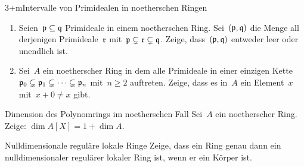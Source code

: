 \documentclass[entwurf]{uebblatt}
\begin{document}

\begin{aufgabe}{3+m}{Intervalle von Primidealen in noetherschen Ringen}
\begin{enumerate}
\item
Seien~$\mathfrak{p} \subseteq \mathfrak{q}$ Primideale in einem
noetherschen Ring. Sei~$(\mathfrak{p},\mathfrak{q})$ die Menge all derjenigen Primideale~$\mathfrak{r}$
mit~$\mathfrak{p} \subsetneq \mathfrak{r} \subsetneq \mathfrak{q}$. Zeige, dass~$(\mathfrak{p},\mathfrak{q})$ entweder
leer oder unendlich ist.
\item Sei~$A$ ein noetherscher Ring in dem alle Primideale in einer einzigen Kette~$\mathfrak{p}_0
\subsetneq \mathfrak{p}_1 \subsetneq \cdots \subsetneq \mathfrak{p}_n$ mit~$n \geq 2$ auftreten.
Zeige, dass es in~$A$ ein Element~$x$ mit~$x + 0 \neq x$ gibt.
\end{enumerate}
\end{aufgabe}

\begin{aufgabe}{}{Dimension des Polynomrings im noetherschen Fall}
Sei~$A$ ein noetherscher Ring. Zeige: $\dim A[X] = 1 + \dim A$.
\end{aufgabe}

\begin{aufgabe}{}{Nulldimensionale reguläre lokale Ringe}
Zeige, dass ein Ring genau dann ein nulldimensionaler regulärer lokaler Ring
ist, wenn er ein Körper ist.
\end{aufgabe}
\end{document}
